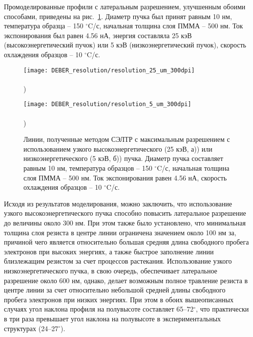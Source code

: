 Промоделированные профили с латеральным разрешением, улучшенным обоими способами, приведены на рис.~\ref{fig:DEBER_resolution}. Диаметр пучка был принят равным 10 нм, температура образца -- 150 $^\circ$C/с, начальная толщина слоя ПММА -- 500 нм. Ток экспонирования был равен 4.56 нА, энергия составляла 25 кэВ (высокоэнергетический пучок) или 5 кэВ (низкоэнергетический пучок), скорость охлаждения образцов -- 10 $^\circ$C/с.

\begin{figure}[t]
	\begin{minipage}{0.48\textwidth}
		\texttt{[image: DEBER\_resolution/resolution\_25\_um\_300dpi]} \\
		\vspace{-28.7ex} \\ ) \\ \vspace{28.7ex}
	\end{minipage}
	\begin{minipage}{0.48\textwidth}
		\texttt{[image: DEBER\_resolution/resolution\_5\_um\_300dpi]} \\
		\vspace{-28.7ex} \\ ) \\ \vspace{28.7ex}
	\end{minipage}
	\vspace{-3.5em}
	\caption{Линии, полученные методом СЭЛТР с максимальным разрешением с использованием узкого высокоэнергетического (25 кэВ, а)) или низкоэнергетического (5 кэВ, б)) пучка. Диаметр пучка составляет равным 10 нм, температура образцов -- 150 $^\circ$C/с, начальная толщина слоя ПММА -- 500 нм. Ток экспонирования равен 4.56 нА, скорость охлаждения образцов -- 10 $^\circ$C/с.}
	\label{fig:DEBER_resolution}
\end{figure}

Исходя из результатов моделирования, можно заключить, что использование узкого высокоэнергетического пучка способно повысить латеральное разрешение до величины около 300 нм. При этом также было установлено, что минимальная толщина слоя резиста в центре линии ограничена значением около 100 нм за, причиной чего является относительно большая средняя длина свободного пробега электронов при высоких энергиях, а также быстрое заполнение линии близлежащим резистом за счет процессов растекания. Использование узкого низкоэнергетического пучка, в свою очередь, обеспечивает латеральное разрешение около 600 нм, однако, делает возможным полное травление резиста в центре линии за счет относительно небольшой средней длины свободного пробега электронов при низких энергиях. При этом в обоих вышеописанных случаях угол наклона профиля на полувысоте составляет 65--72$^\circ$, что практически в три раза превышает угол наклона на полувысоте в экспериментальных структурах (24--27$^\circ$).

